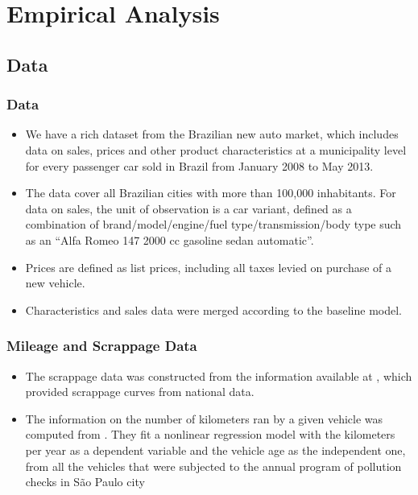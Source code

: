 \documentclass{beamer}
\begin{document}
\section{Empirical Analysis}

\subsection{Data}

\begin{frame}[fragile]\frametitle{Data}

\begin{itemize}
    \item We have a rich dataset from the Brazilian new auto market, which includes data on sales, prices and other product characteristics at a municipality level for every passenger car sold in Brazil from January 2008 to May 2013. 
    \item The data cover all Brazilian cities with more than 100,000 inhabitants. For data on sales, the unit of observation is a car variant, defined as a combination of brand/model/engine/fuel type/transmission/body type such as an ``Alfa Romeo 147 2000 cc gasoline sedan automatic''.
    \item Prices are defined as list prices, including all taxes levied on purchase of a new vehicle.
    \item Characteristics and sales data were merged according to the baseline model.
\end{itemize}
    


\end{frame}

\begin{frame}[fragile]\frametitle{Mileage and Scrappage Data}

\begin{itemize}
    \item The scrappage data was constructed from the information available at \citet{CETESB2015}, which provided scrappage curves from national data. 
    \item The information on the number of kilometers ran by a given vehicle was computed from \citet{Bruni}. They fit a nonlinear regression model with the kilometers per year as a dependent variable and the vehicle age as the independent one, from all the vehicles that were subjected to the annual program of pollution checks in São Paulo city
\end{itemize}
    


\end{frame}
\end{document}
